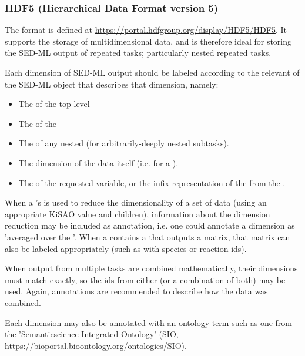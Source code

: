 \begin{blockChanged}
\subsubsection{HDF5 (Hierarchical Data Format version 5)}
\label{sec:dataFormatHDF5}
The format  is defined at \url{https://portal.hdfgroup.org/display/HDF5/HDF5}.  It supports the storage of multidimensional data, and is therefore ideal for storing the SED-ML output of repeated tasks; particularly nested repeated tasks.

Each dimension of SED-ML \RepeatedTask output should be labeled according to the relevant  of the SED-ML object that describes that dimension, namely:

\begin{itemize}
    \item The  of the top-level \RepeatedTask
    \item The  of the \SubTask
    \item The  of any nested \SubTask (for arbitrarily-deeply nested subtasks).
    \item The dimension of the data itself (i.e.  for a \UniformTimeCourse).
    \item The  of the requested variable, or the infix representation of the \Math from the \DataGenerator.
\end{itemize}

When a \Variable's  is used to reduce the dimensionality of a set of data (using an appropriate KiSAO value and \AppliedDimension children), information about the dimension reduction may be included as annotation, i.e. one could annotate a \SubTask dimension as 'averaged over the \RepeatedTask \element{[id]}'.  When a \DataGenerator contains a \Variable that outputs a matrix, that matrix can also be labeled appropriately (such as with species or reaction ids).

When output from multiple tasks are combined mathematically, their dimensions must match exactly, so the ids from either (or a combination of both) may be used.  Again, annotations are recommended to describe how the data was combined.

Each dimension may also be annotated with an ontology term such as one from the 'Semanticscience Integrated Ontology' (SIO, \url{https://bioportal.bioontology.org/ontologies/SIO}).

\end{blockChanged}


